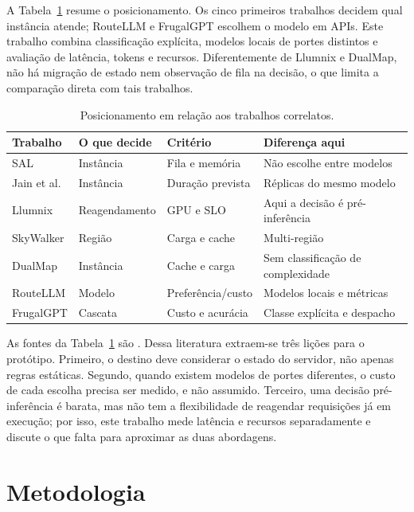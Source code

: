 \documentclass[12pt]{article}
\begin{document}
A Tabela~\ref{tab:relacionados} resume o posicionamento. Os cinco primeiros trabalhos decidem qual instância atende; RouteLLM e FrugalGPT escolhem o modelo em APIs. Este trabalho combina classificação explícita, modelos locais de portes distintos e avaliação de latência, tokens e recursos. Diferentemente de Llumnix e DualMap, não há migração de estado nem observação de fila na decisão, o que limita a comparação direta com tais trabalhos.

\begin{table}[htb]
\centering
\small
\caption{Posicionamento em relação aos trabalhos correlatos.}
\label{tab:relacionados}
\setlength{\tabcolsep}{4pt}
\begin{tabular}{p{2.0cm}p{3.4cm}p{3.4cm}p{4.7cm}}
\hline\hline
\textbf{Trabalho} & \textbf{O que decide} & \textbf{Critério} & \textbf{Diferença aqui} \\
\hline
SAL & Instância & Fila e memória & Não escolhe entre modelos \\
Jain et al. & Instância & Duração prevista & Réplicas do mesmo modelo \\
Llumnix & Reagendamento & GPU e SLO & Aqui a decisão é pré-inferência \\
SkyWalker & Região & Carga e cache & Multi-região \\
DualMap & Instância & Cache e carga & Sem classificação de complexidade \\
RouteLLM & Modelo & Preferência/custo & Modelos locais e métricas \\
FrugalGPT & Cascata & Custo e acurácia & Classe explícita e despacho \\
\hline\hline
\end{tabular}
\setlength{\tabcolsep}{6pt}
\end{table}

As fontes da Tabela~\ref{tab:relacionados} são \cite{article:llm_gpu,article:performance_lb,article:llumnix,article:skywalker,article:dualmap,article:routellm,article:frugalgpt}. Dessa literatura extraem-se três lições para o protótipo. Primeiro, o destino deve considerar o estado do servidor, não apenas regras estáticas. Segundo, quando existem modelos de portes diferentes, o custo de cada escolha precisa ser medido, e não assumido. Terceiro, uma decisão pré-inferência é barata, mas não tem a flexibilidade de reagendar requisições já em execução; por isso, este trabalho mede latência e recursos separadamente e discute o que falta para aproximar as duas abordagens.

\section{Metodologia}
\end{document}
